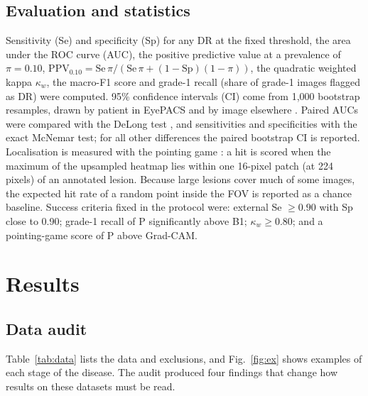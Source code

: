 \documentclass[11pt,a4paper]{article}
\begin{document}
\subsection{Evaluation and statistics}
Sensitivity (Se) and specificity (Sp) for any DR at the fixed threshold, the area under the ROC curve (AUC), the positive predictive value at a prevalence of $\pi=0.10$, $\mathrm{PPV}_{0.10}=\mathrm{Se}\,\pi/(\mathrm{Se}\,\pi+(1-\mathrm{Sp})(1-\pi))$, the quadratic weighted kappa $\kappa_w$, the macro-F1 score and grade-1 recall (share of grade-1 images flagged as DR) were computed. 95\% confidence intervals (CI) come from 1{,}000 bootstrap resamples, drawn by patient in EyePACS and by image elsewhere \cite{efron1993}. Paired AUCs were compared with the DeLong test \cite{delong1988}, and sensitivities and specificities with the exact McNemar test; for all other differences the paired bootstrap CI is reported. Localisation is measured with the pointing game \cite{zhang2018}: a hit is scored when the maximum of the upsampled heatmap lies within one 16-pixel patch (at 224 pixels) of an annotated lesion. Because large lesions cover much of some images, the expected hit rate of a random point inside the FOV is reported as a chance baseline. Success criteria fixed in the protocol were: external Se $\geq0.90$ with Sp close to 0.90; grade-1 recall of P significantly above B1; $\kappa_w\geq0.80$; and a pointing-game score of P above Grad-CAM.
\section{Results}\label{sec:res}
\subsection{Data audit}
Table~\ref{tab:data} lists the data and exclusions, and Fig.~\ref{fig:ex} shows examples of each stage of the disease. The audit produced four findings that change how results on these datasets must be read.
\end{document}
